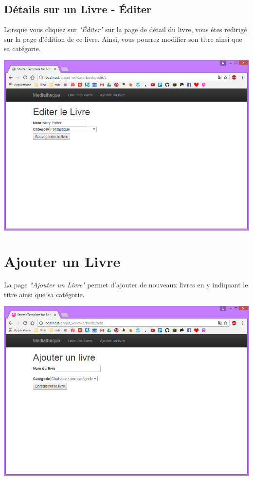 \documentclass{report}
\begin{document}
			\subsection{D\'{e}tails sur un Livre - \'{E}diter}
			Lorsque vous cliquez sur \textit{"\'{E}diter"} sur la page de d\'{e}tail du livre, vous \'{e}tes redirig\'{e} sur la page d'\'{e}dition de ce livre. Ainsi, vous pourrez modifier son titre ainsi que sa cat\'{e}gorie.
			\begin{center}
				\includegraphics[scale=0.4]{img/manuel/DetailLivre_Editer.png}  
			\end{center}
			
		\section{Ajouter un Livre}
		La page \textit{"Ajouter un Livre"} permet d'ajouter de nouveaux livres en y indiquant le titre ainsi que sa cat\'{e}gorie.
		\begin{center}
			\includegraphics[scale=0.4]{img/manuel/DetailAjouterLivre.png}  
		\end{center}
		
\end{document}
